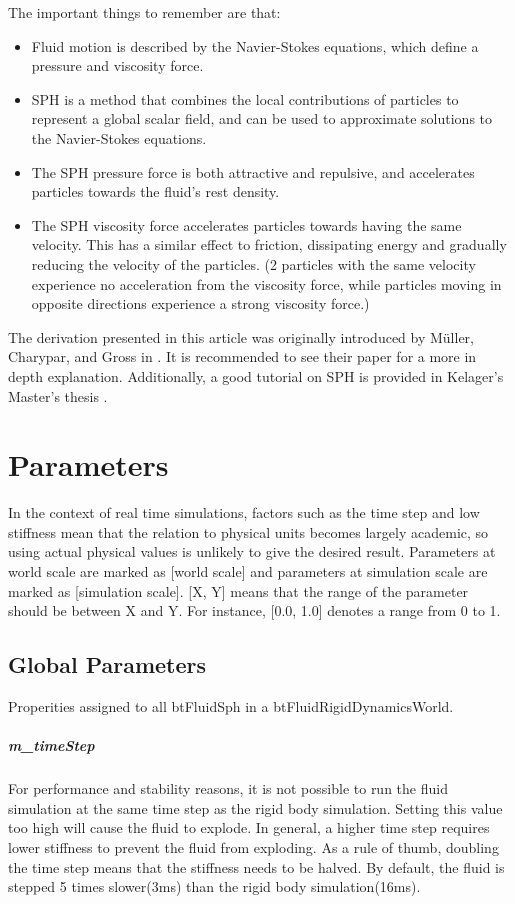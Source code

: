 \documentclass[]{article}
\begin{document}
	The important things to remember are that: 
	\begin{itemize}
		\item Fluid motion is described by the Navier-Stokes equations, which define a pressure and viscosity force.
		\item SPH is a method that combines the local contributions of particles to represent a global scalar field, 
		and can be used to approximate solutions to the Navier-Stokes equations.
		\item The SPH pressure force is both attractive and repulsive, and accelerates particles towards the fluid's 
		rest density.
		\item The SPH viscosity force accelerates particles towards having the same velocity. This has a similar effect
		to friction, dissipating energy and gradually reducing the velocity of the particles. (2 particles with the 
		same velocity experience no acceleration from the viscosity force, while particles moving in opposite directions 
		experience a strong viscosity force.)
	\end{itemize}
	
	The derivation presented in this article was originally introduced by M\"{u}ller, Charypar, and Gross in 
	\cite{Muller:2003:PFS:846276.846298}. It is recommended to see their paper for a more in depth explanation. 
	Additionally, a good tutorial on SPH is provided in Kelager's Master's thesis \cite{MK:2006}.\\

\pagebreak
\section{Parameters}
	In the context of real time simulations, factors such as the time step and low stiffness mean that the relation to
	physical units becomes largely academic, so using actual physical values is unlikely to give the desired result. 
	Parameters at world scale are marked as [world scale] and parameters at simulation scale are marked as 
	[simulation scale]. [X, Y] means that the range of the parameter should be between X and Y. For instance, [0.0, 1.0]
	denotes a range from 0 to 1.
	
	\subsection{Global Parameters}
		Properities assigned to all btFluidSph in a btFluidRigidDynamicsWorld.
	
		\subparagraph{m\_timeStep}
			For performance and stability reasons, it is not possible to run the fluid simulation at the same time step as 
			the rigid body simulation. Setting this value too high will cause the fluid to explode. In general, a higher 
			time step requires lower stiffness to prevent the fluid from exploding. As a rule of thumb, doubling the time step
			means that the stiffness needs to be halved. By default, the fluid is stepped 5 times slower(3ms) than the rigid body simulation(16ms).
		
\end{document}
